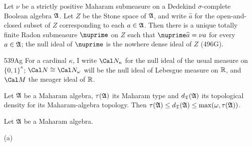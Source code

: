 {Let $\nu$ be a strictly positive Maharam submeasure on a
Dedekind $\sigma$-complete Boolean algebra $\frak A$.
Let $Z$ be the Stone space
of $\frak A$, and write $\widehat{a}$ for the open-and-closed subset of $Z$
corresponding to each $a\in\frak A$.
Then there is a unique totally finite Radon
submeasure $\nuprime$ on $Z$ such that
$\nuprime\widehat{a}=\nu a$ for every $a\in\frak A$; the null ideal of $\nuprime$
is the nowhere dense ideal of $Z$ (496G).

\spheader 539Ag For a cardinal $\kappa$, I write $\Cal N_{\kappa}$ for the
null ideal of the usual measure on $\{0,1\}^{\kappa}$;
$\Cal N\cong\Cal N_{\omega}$ will be the null ideal of Lebesgue measure on
$\Bbb R$, and $\Cal M$ the meager ideal of $\Bbb R$.
}%

 Let $\frak A$ be a Maharam algebra,
$\tau(\frak A)$ its Maharam type and $d_{\frak T}(\frak A)$ its
topological density for its Maharam-algebra topology.
Then $\tau(\frak A)\le d_{\frak T}(\frak A)\le\max(\omega,\tau(\frak A))$.


 Let $\frak A$ be a Maharam algebra.

(a)



